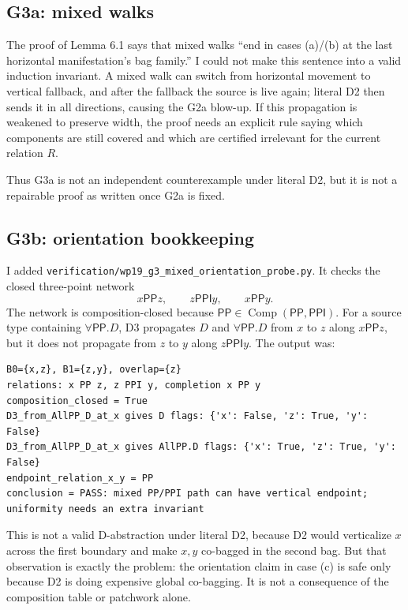 \documentclass[11pt]{article}
\newcommand{\PP}{\mathsf{PP}}
\newcommand{\PPI}{\mathsf{PPI}}
\newcommand{\Comp}{\operatorname{Comp}}
\newcommand{\code}[1]{\texttt{#1}}
\begin{document}
\subsection{G3a: mixed walks}

The proof of Lemma 6.1 says that mixed walks ``end in cases (a)/(b) at the last
horizontal manifestation's bag family.''  I could not make this sentence into a
valid induction invariant.  A mixed walk can switch from horizontal movement to
vertical fallback, and after the fallback the source is live again; literal D2
then sends it in all directions, causing the G2a blow-up.  If this propagation
is weakened to preserve width, the proof needs an explicit rule saying which
components are still covered and which are certified irrelevant for the current
relation $R$.

Thus G3a is not an independent counterexample under literal D2, but it is not a
repairable proof as written once G2a is fixed.

\subsection{G3b: orientation bookkeeping}

I added \code{verification/wp19\_g3\_mixed\_orientation\_probe.py}.  It checks
the closed three-point network
\[
  x\PP z,
  \qquad z\PPI y,
  \qquad x\PP y.
\]
The network is composition-closed because $\PP\in\Comp(\PP,\PPI)$.
For a source type containing $\forall\PP.D$, D3 propagates $D$ and
$\forall\PP.D$ from $x$ to $z$ along $x\PP z$, but it does not propagate from
$z$ to $y$ along $z\PPI y$.  The output was:
\begin{verbatim}
B0={x,z}, B1={z,y}, overlap={z}
relations: x PP z, z PPI y, completion x PP y
composition_closed = True
D3_from_AllPP_D_at_x gives D flags: {'x': False, 'z': True, 'y': False}
D3_from_AllPP_D_at_x gives AllPP.D flags: {'x': True, 'z': True, 'y': False}
endpoint_relation_x_y = PP
conclusion = PASS: mixed PP/PPI path can have vertical endpoint; uniformity needs an extra invariant
\end{verbatim}

This is not a valid D-abstraction under literal D2, because D2 would
verticalize $x$ across the first boundary and make $x,y$ co-bagged in the
second bag.  But that observation is exactly the problem: the orientation claim
in case (c) is safe only because D2 is doing expensive global co-bagging.  It
is not a consequence of the composition table or patchwork alone.
\end{document}
